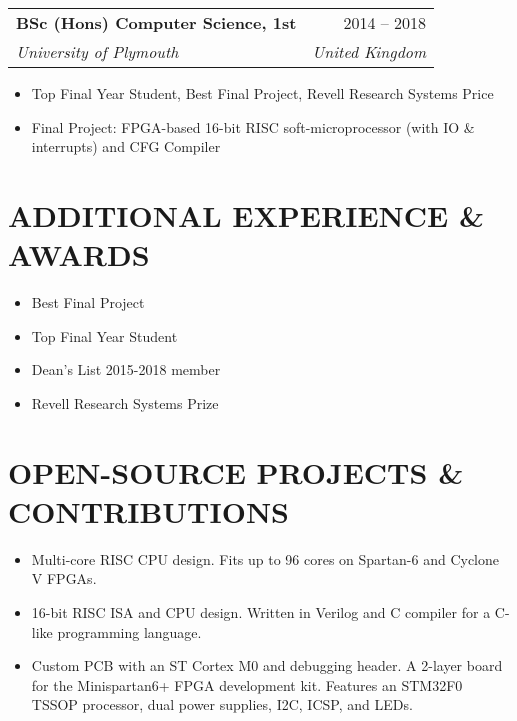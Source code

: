 \documentclass[letterpaper,11pt]{article}
\makeatletter
\newcommand{\resumeItem}[1]{
  \item\small{
    {#1 \vspace{-5pt}}
  }
}
\newcommand{\resumeSubheading}[4]{
  \vspace{-1pt}
    \begin{tabular*}{\textwidth}{l@{\extracolsep{\fill}}r}
      \textbf{#1} & #2 \\
      \textit{#3} & \textit{#4} \\
    \end{tabular*}\vspace{-3pt}
}
\newcommand{\resumeItemListStart}{\begin{itemize}[leftmargin=10mm]}
\newcommand{\resumeItemListEnd}{\end{itemize}\vspace{-5pt}}
\makeatother
\begin{document}
     \vspace{10pt}
     \resumeSubheading
     {BSc (Hons) Computer Science, 1st}
     {2014 -- 2018}
     {University of Plymouth}
     {United Kingdom}
    \resumeItemListStart
        \resumeItem{Top Final Year Student, Best Final Project, Revell Research Systems Price}
        \resumeItem{Final Project: FPGA-based 16-bit RISC soft-microprocessor (with IO \& interrupts) and CFG Compiler}
    \resumeItemListEnd

\vspace{10pt}
\section{ADDITIONAL EXPERIENCE \& AWARDS}
    \vspace{-15pt}
\begin{multicols}{2}
    \resumeItemListStart
    \resumeItem{Best Final Project}
    \resumeItem{Top Final Year Student}
    \resumeItemListEnd
\columnbreak
    \resumeItemListStart
    \resumeItem{Dean’s List 2015-2018 member}
    \resumeItem{Revell Research Systems Prize}
    \resumeItemListEnd
\end{multicols}\vspace{5pt}

\iftrue
\section{OPEN-SOURCE PROJECTS \& CONTRIBUTIONS}
    \resumeItemListStart
    \resumeItem{Multi-core RISC CPU design. Fits up to 96 cores on Spartan-6 and Cyclone V FPGAs.}
    \resumeItem{16-bit RISC ISA and CPU design. Written in Verilog and C compiler for a C-like programming language.}
    \resumeItem{Custom PCB with an ST Cortex M0 and debugging header. A 2-layer board for the Minispartan6+ FPGA development kit. Features an STM32F0 TSSOP processor, dual power supplies, I2C, ICSP, and LEDs.}
\resumeItemListEnd
\fi

\end{document}
